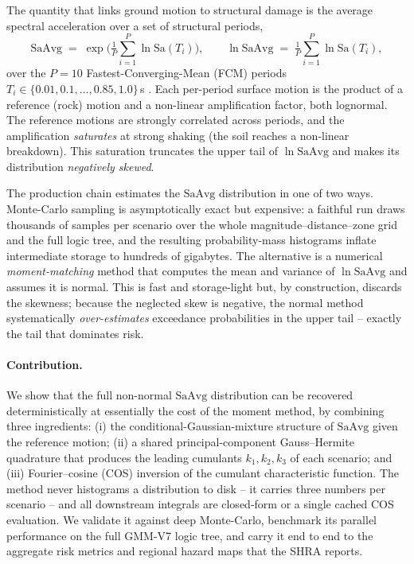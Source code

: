 \documentclass[11pt,a4paper]{article}
\newcommand{\saavg}{\mathrm{SaAvg}}
\begin{document}
The quantity that links ground motion to structural damage is the average
spectral acceleration over a set of structural periods,
\begin{equation}
  \saavg \;=\; \exp\!\Big(\tfrac{1}{P}\sum_{i=1}^{P}\ln \mathrm{Sa}(T_i)\Big),
  \qquad
  \ln\saavg \;=\; \tfrac{1}{P}\sum_{i=1}^{P}\ln \mathrm{Sa}(T_i),
  \label{eq:saavg}
\end{equation}
over the $P=10$ Fastest-Converging-Mean (FCM) periods
$T_i\in\{0.01,0.1,\dots,0.85,1.0\}$\,s \cite{crowleyPinho}. Each per-period
surface motion is the product of a reference (rock) motion and a non-linear
amplification factor, both lognormal. The reference motions are strongly
correlated across periods, and the amplification \emph{saturates} at strong
shaking (the soil reaches a non-linear breakdown). This saturation truncates the
upper tail of $\ln\saavg$ and makes its distribution \emph{negatively skewed}.

The production chain estimates the $\saavg$ distribution in one of two ways.
Monte-Carlo sampling is asymptotically exact but expensive: a faithful run draws
thousands of samples per scenario over the whole magnitude--distance--zone grid
and the full logic tree, and the resulting probability-mass histograms inflate
intermediate storage to hundreds of gigabytes. The alternative is a numerical
\emph{moment-matching} method that computes the mean and variance of $\ln\saavg$
and assumes it is normal. This is fast and storage-light but, by construction,
discards the skewness; because the neglected skew is negative, the normal method
systematically \emph{over-estimates} exceedance probabilities in the upper tail
-- exactly the tail that dominates risk.

\paragraph{Contribution.} We show that the full non-normal $\saavg$ distribution
can be recovered deterministically at essentially the cost of the moment method,
by combining three ingredients: (i) the conditional-Gaussian-mixture structure
of $\saavg$ given the reference motion; (ii) a shared principal-component
Gauss--Hermite quadrature that produces the leading cumulants $k_1,k_2,k_3$ of
each scenario; and (iii) Fourier--cosine (COS) inversion
\cite{fangOosterlee} of the cumulant characteristic function. The method never
histograms a distribution to disk -- it carries three numbers per scenario -- and
all downstream integrals are closed-form or a single cached COS evaluation. We
validate it against deep Monte-Carlo, benchmark its parallel performance on the
full GMM-V7 logic tree, and carry it end to end to the aggregate risk metrics and
regional hazard maps that the SHRA reports.
\end{document}
